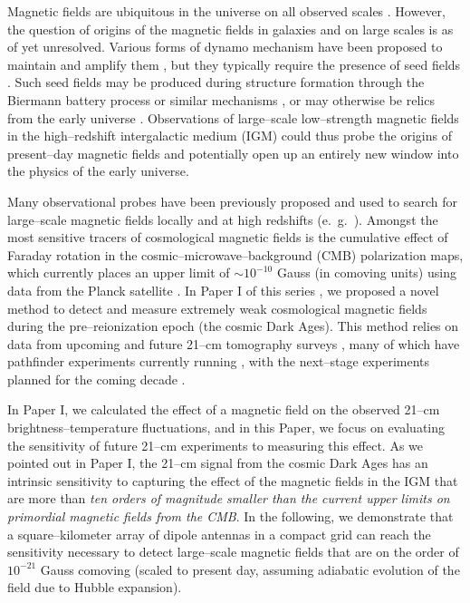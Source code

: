 \documentclass[aps,prd,twocolumn,floatfix,showpacs,superscriptaddress,nofootinbib]{revtex4-1}
\begin{document}
Magnetic fields are ubiquitous in the universe on all observed scales \cite{2013A&ARv..21...62D,Vallee04,Neronov10,2005LNP...664...89W,2012SSRv..166..215B,2016ApJ...818L..10T}. However, the question of origins of the magnetic fields in galaxies and on large scales is as of yet unresolved. Various forms of dynamo mechanism have been proposed to maintain and amplify them \cite{2013PhRvE..87e3110P}, but they typically require the presence of seed fields \cite{2013A&ARv..21...62D}. Such seed fields may be produced during structure formation through the Biermann battery process or similar mechanisms \cite{Naoz13,2013PhRvL.111e1303N}, or may otherwise be relics from the early universe \cite{2013A&ARv..21...62D,2012SSRv..166...37W,2014JCAP...05..040K}. Observations of large--scale low--strength magnetic fields in the high--redshift intergalactic medium (IGM) could thus probe the origins of present--day magnetic fields and potentially open up an entirely new window into the physics of the early universe.

Many observational probes have been previously proposed and used to search for large--scale magnetic fields locally and at high redshifts (e.~g.~\cite{Yamazaki10,Blasi99,Tavecchio10,Dolag11,2005LNP...664...89W,2014JCAP...01..009K,2013ApJ...770...47K,2014PhRvD..89j3522S,2006MNRAS.372.1060T,2009ApJ...692..236S}). Amongst the most sensitive tracers of cosmological magnetic fields is the cumulative effect of Faraday rotation in the cosmic--microwave--background (CMB) polarization maps, which currently places an upper limit of $\sim$$10^{-10}$ Gauss (in comoving units) using data from the Planck satellite \cite{2015arXiv150201594P}. In Paper I of this series \cite{2014arXiv1410.2250V}, we proposed a novel method to detect and measure extremely weak cosmological magnetic fields during the pre--reionization epoch (the cosmic Dark Ages). This method relies on data from upcoming and future 21--cm tomography surveys \cite{1997ApJ...475..429M,2004PhRvL..92u1301L}, many of which have pathfinder experiments currently running \cite{2012arXiv1201.1700G,2011AAS...21813206B,2014ApJ...788..106P,2008arXiv0802.1727C,Vanderlinde14,2015AAS...22532803D}, with the next--stage experiments planned for the coming decade \cite{2008arXiv0802.1727C,2015AAS...22532803D}. 

In Paper I, we calculated the effect of a magnetic field on the observed 21--cm brightness--temperature fluctuations, and in this Paper, we focus on evaluating the sensitivity of future 21--cm experiments to measuring this effect. As we pointed out in Paper I, the 21--cm signal from the cosmic Dark Ages has an intrinsic sensitivity to capturing the effect of the magnetic fields in the IGM that are more than \textit{ten orders of magnitude smaller than the current upper limits on primordial magnetic fields from the CMB}. In the following, we demonstrate that a square--kilometer array of dipole antennas in a compact grid can reach the sensitivity necessary to detect large--scale magnetic fields that are on the order of $10^{-21}$ Gauss comoving (scaled to present day, assuming adiabatic evolution of the field due to Hubble expansion). 
\end{document}
